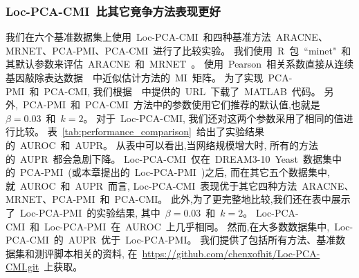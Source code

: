 \subsubsection{Loc-PCA-CMI~比其它竞争方法表现更好}

我们在六个基准数据集上使用~Loc-PCA-CMI~和四种基准方法~ARACNE、MRNET、PCA-PMI、PCA-CMI~进行了比较实验。
我们使用~R~包~``minet"~和其默认参数来评估~ARACNE~和~MRNET~\cite{meyer2008minet}。
使用~Pearson~相关系数直接从连续基因敲除表达数据~\cite{olsen2008impact,meyer2010information}~中近似估计方法的~MI~矩阵。
为了实现~PCA-PMI~和~PCA-CMI, 我们根据~\cite{zhang2011inferring,zhao2016part}~中提供的~URL~下载了~MATLAB~代码。
另外,~PCA-PMI~和~PCA-CMI~方法中的参数使用它们推荐的默认值,也就是~$\beta = 0.03$~和~$k = 2$。
对于~Loc-PCA-CMI, 我们还对这两个参数采用了相同的值进行比较。
表~\ref{tab:performance_comparison}~给出了实验结果的~AUROC~和~AUPR。
从表中可以看出,当网络规模增大时, 所有的方法的~AUPR~都会急剧下降。
Loc-PCA-CMI~仅在~DREAM3-10~Yeast~数据集中的~PCA-PMI~(或本章提出的~Loc-PCA-PMI~)之后,
而在其它五个数据集中,就~AUROC~和~AUPR~而言,
Loc-PCA-CMI~表现优于其它四种方法~ARACNE、MRNET、PCA-PMI~和~PCA-CMI。
此外,为了更完整地比较,我们还在表中展示了~Loc-PCA-PMI~的实验结果,
其中~$\beta = 0.03$~和~$k = 2$。
Loc-PCA-CMI~和~Loc-PCA-PMI~在~AUROC~上几乎相同。
然而,在大多数数据集中,~Loc-PCA-CMI~的~AUPR~优于~Loc-PCA-PMI。
我们提供了包括所有方法、基准数据集和测评脚本相关的资料, 
在~\url{https://github.com/chenxofhit/Loc-PCA-CMI.git}~上获取。

